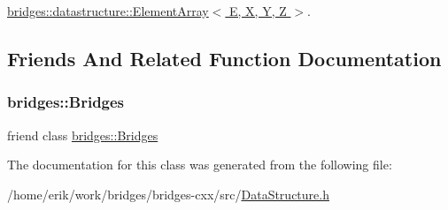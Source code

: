 \hyperlink{classbridges_1_1datastructure_1_1_element_array_a22d8c37e88616105cdb7c755f99fdb20}{bridges\+::datastructure\+::\+Element\+Array$<$ E, X, Y, Z $>$}.



\subsection{Friends And Related Function Documentation}
\mbox{\label{classbridges_1_1datastructure_1_1_data_structure_a5c4164a6c5cd1eab3f12871efc2dbe26}} 
\subsubsection{\texorpdfstring{bridges\+::\+Bridges}{bridges::Bridges}}
{\footnotesize\ttfamily friend class \hyperlink{classbridges_1_1_bridges}{bridges\+::\+Bridges}\hspace{0.3cm}{\ttfamily [friend]}}



The documentation for this class was generated from the following file\+:\begin{DoxyCompactItemize}
\item 
/home/erik/work/bridges/bridges-\/cxx/src/\hyperlink{_data_structure_8h}{Data\+Structure.\+h}\end{DoxyCompactItemize}
